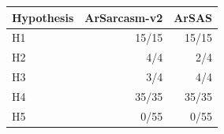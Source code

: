 \begin{tabular}{lrr}
\toprule
Hypothesis & ArSarcasm-v2 & ArSAS \\
\midrule
H1 & 15/15 & 15/15 \\
H2 & 4/4 & 2/4 \\
H3 & 3/4 & 4/4 \\
H4 & 35/35 & 35/35 \\
H5 & 0/55 & 0/55 \\
\bottomrule
\end{tabular}
